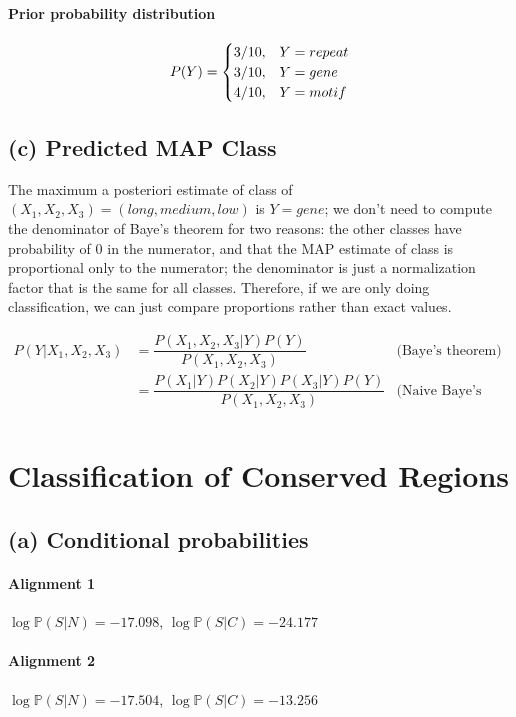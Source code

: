 \documentclass[12pt]{article}
\begin{document}
\paragraph{Prior probability distribution}
\[
P(Y) = 
\begin{cases}
    $3/10$, & Y = repeat \\
    $3/10$, & Y = gene \\
    $4/10$, & Y = motif \\
\end{cases}
\]

\subsection*{(c) Predicted MAP Class}

The maximum a posteriori estimate of class of
$(X_1, X_2, X_3) = (long, medium, low)$ is $Y = gene$;
we don't need to compute the denominator of 
Baye's theorem for two reasons: the other classes have
probability of $0$ in the numerator, and that the
MAP estimate of class is proportional only to the
numerator; the denominator is just a normalization
factor that is the same for all classes. Therefore, 
if we are only doing classification, we can just
compare proportions rather than exact values.

\begin{align*}
P(Y | X_1, X_2, X_3)
&= \dfrac{P(X_1, X_2, X_3 | Y)P(Y)}{P(X_1, X_2, X_3)}
& \text{(Baye's theorem)}\\
&= \dfrac{P(X_1 | Y)P(X_2 | Y)P(X_3 | Y)P(Y)}{P(X_1, X_2, X_3)}
& \text{(Naive Baye's assumption)}\\
\end{align*}

\section{Classification of Conserved Regions}
\subsection*{(a) Conditional probabilities}
\paragraph{Alignment 1}
$\log \mathbb{P}(S | N) = -17.098$,
$\log \mathbb{P}(S | C) = -24.177$

\paragraph{Alignment 2}
$\log \mathbb{P}(S | N) = -17.504$, 
$\log \mathbb{P}(S | C) = -13.256$
\end{document}
